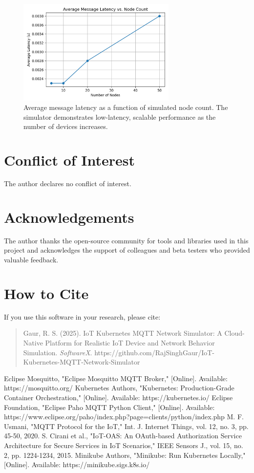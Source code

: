 \documentclass[review]{elsarticle}
\begin{document}
\begin{figure}[h]
\centering
\includegraphics[width=0.7\textwidth]{latency_vs_nodes.png}
\caption{Average message latency as a function of simulated node count. The simulator demonstrates low-latency, scalable performance as the number of devices increases.}
\label{fig:latency-vs-nodes}
\end{figure}

\section*{Conflict of Interest}
The author declares no conflict of interest.

\section*{Acknowledgements}
The author thanks the open-source community for tools and libraries used in this project and acknowledges the support of colleagues and beta testers who provided valuable feedback.

\section*{How to Cite}
If you use this software in your research, please cite:
\begin{quote}
Gaur, R. S. (2025). IoT Kubernetes MQTT Network Simulator: A Cloud-Native Platform for Realistic IoT Device and Network Behavior Simulation. \textit{SoftwareX}. https://github.com/RajSinghGaur/IoT-Kubernetes-MQTT-Network-Simulator
\end{quote}

\begin{thebibliography}{99}
 Eclipse Mosquitto, "Eclipse Mosquitto MQTT Broker," [Online]. Available: https://mosquitto.org/
 Kubernetes Authors, "Kubernetes: Production-Grade Container Orchestration," [Online]. Available: https://kubernetes.io/
 Eclipse Foundation, "Eclipse Paho MQTT Python Client," [Online]. Available: https://www.eclipse.org/paho/index.php?page=clients/python/index.php
 M. F. Usmani, "MQTT Protocol for the IoT," Int. J. Internet Things, vol. 12, no. 3, pp. 45-50, 2020.
 S. Cirani et al., "IoT-OAS: An OAuth-based Authorization Service Architecture for Secure Services in IoT Scenarios," IEEE Sensors J., vol. 15, no. 2, pp. 1224-1234, 2015.
 Minikube Authors, "Minikube: Run Kubernetes Locally," [Online]. Available: https://minikube.sigs.k8s.io/
\end{thebibliography}
\end{document}
